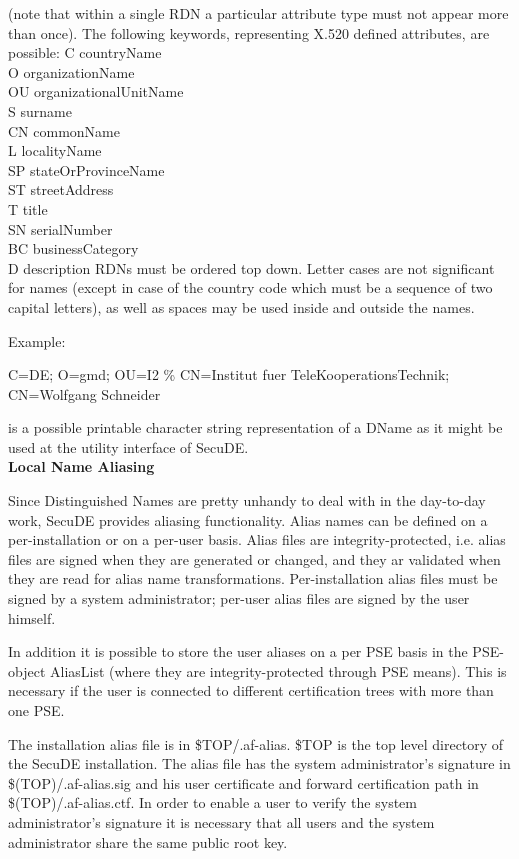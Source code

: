 (note that within a single RDN a particular attribute type must not
appear more than once).
The following keywords, representing X.520 defined attributes,  are 
possible:
{\small
\bvtab
C   \2 countryName \\
O   \2 organizationName  \\
OU  \2 organizationalUnitName \\
S   \2 surname \\
CN  \2 commonName \\
L   \2 localityName \\
SP  \2 stateOrProvinceName \\
ST  \2 streetAddress \\
T   \2 title \\
SN  \2 serialNumber \\
BC  \2 businessCategory \\
D   \2 description
\evtab
}
RDNs must be ordered top down. Letter cases are not significant for names 
(except in case of the country code which must be a sequence of two capital
 letters), as well as spaces may be used inside and outside the names.

Example: 

{\small
C=DE; O=gmd; OU=I2 \% CN=Institut fuer TeleKooperationsTechnik; CN=Wolfgang 
Schneider}

is a possible printable character string representation of a DName as it might
be used at the utility interface of SecuDE. 
\\ [1em]
{\bf Local Name Aliasing}

Since Distinguished Names are pretty unhandy to deal with in the
day-to-day work, SecuDE provides aliasing functionality. Alias names
can be defined on a per-installation or on a per-user basis. Alias
files are integrity-protected, i.e. alias files are signed when they are
generated or changed, and they ar validated when they are read for
alias name transformations. Per-installation alias files must be signed
by a system administrator; per-user alias files are signed by the
user himself. 

In addition it is possible to store the user aliases on a per PSE basis
in the PSE-object AliasList (where they are integrity-protected through
PSE means). This is necessary if the user is connected to different
certification trees with more than one PSE.

The installation alias file is in \$TOP/.af-alias. \$TOP
is the top level directory of the SecuDE installation. The alias file
has the system administrator's signature in \$(TOP)/.af-alias.sig and his user
certificate and forward certification path in \$(TOP)/.af-alias.ctf.
In order to enable a user to verify the system administrator's signature
it is necessary that all users and the system administrator share the
same public root key.

